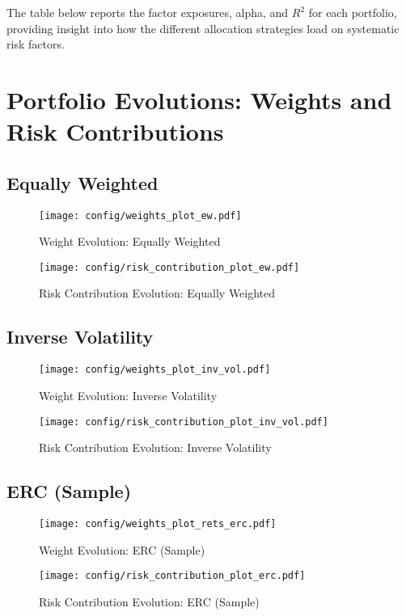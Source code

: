 \documentclass{article}
\begin{document}
The table below reports the factor exposures, alpha, and $R^2$ for each portfolio, providing insight into how the different allocation strategies load on systematic risk factors.
\clearpage



\newpage

\appendix
\section{Portfolio Evolutions: Weights and Risk Contributions}

\subsection{Equally Weighted}
\begin{figure}[H]
    \centering
    \texttt{[image: config/weights\_plot\_ew.pdf]}
    \caption{Weight Evolution: Equally Weighted}
    \label{fig:weights_ew}
\end{figure}
\begin{figure}[H]
    \centering
    \texttt{[image: config/risk\_contribution\_plot\_ew.pdf]}
    \caption{Risk Contribution Evolution: Equally Weighted}
    \label{fig:risk_contribution_ew}
\end{figure}
\clearpage

\subsection{Inverse Volatility}
\begin{figure}[H]
    \centering
    \texttt{[image: config/weights\_plot\_inv\_vol.pdf]}
    \caption{Weight Evolution: Inverse Volatility}
    \label{fig:weights_inv_vol}
\end{figure}
\begin{figure}[H]
    \centering
    \texttt{[image: config/risk\_contribution\_plot\_inv\_vol.pdf]}
    \caption{Risk Contribution Evolution: Inverse Volatility}
    \label{fig:risk_contribution_inv_vol}
\end{figure}
\clearpage

\subsection{ERC (Sample)}
\begin{figure}[H]
    \centering
    \texttt{[image: config/weights\_plot\_rets\_erc.pdf]}
    \caption{Weight Evolution: ERC (Sample)}
    \label{fig:weights_erc_sample}
\end{figure}
\begin{figure}[H]
    \centering
    \texttt{[image: config/risk\_contribution\_plot\_erc.pdf]}
    \caption{Risk Contribution Evolution: ERC (Sample)}
    \label{fig:risk_contribution_erc_sample}
\end{figure}
\clearpage
\end{document}

